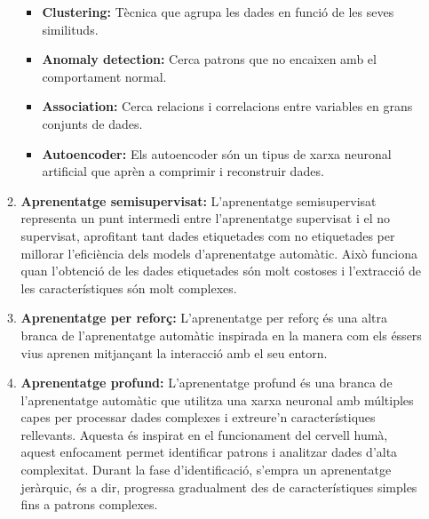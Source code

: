 \begin{enumerate}
\begin{enumerate}
        \begin{itemize}

            \item \textbf{Clustering: } Tècnica que agrupa les dades en funció de les seves similituds.

            \item \textbf{Anomaly detection: } Cerca patrons que no encaixen amb el comportament normal.

            \item \textbf{Association: } Cerca relacions i correlacions entre variables en grans conjunts de dades.

            \item \textbf{Autoencoder: } Els autoencoder són un tipus de xarxa neuronal artificial que aprèn a comprimir i reconstruir dades.

        \end{itemize}

        \item \textbf{Aprenentatge semisupervisat:}
        L'aprenentatge semisupervisat representa un punt intermedi entre l'aprenentatge supervisat i el no supervisat, aprofitant tant dades etiquetades com no etiquetades per millorar l'eficiència dels models d'aprenentatge automàtic. Això funciona quan l'obtenció de les dades etiquetades són molt costoses i l'extracció de les característiques són molt complexes.

        \item \textbf{Aprenentatge per reforç:}
        L'aprenentatge per reforç és una altra branca de l'aprenentatge automàtic inspirada en la manera com els éssers vius aprenen mitjançant la interacció amb el seu entorn.

        \item \textbf{Aprenentatge profund:}
        L'aprenentatge profund és una branca de l'aprenentatge automàtic que utilitza una xarxa neuronal amb múltiples capes per processar dades complexes i extreure'n característiques rellevants. Aquesta és inspirat en el funcionament del cervell humà, aquest enfocament permet identificar patrons i analitzar dades d'alta complexitat. Durant la fase d'identificació, s'empra un aprenentatge jeràrquic, és a dir, progressa gradualment des de característiques simples fins a patrons complexes.

    \end{enumerate}


\end{enumerate}
